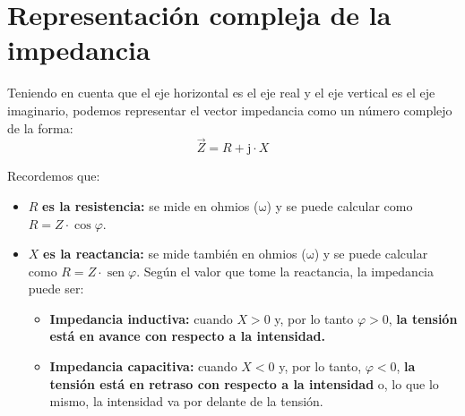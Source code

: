 \documentclass[
  a4paper,
  DIV=11,
  numbers=noendperiod]{scrreprt}
\providecommand{\tightlist}{%
  \setlength{\itemsep}{0pt}\setlength{\parskip}{0pt}}
\newcommand{\sen}{\operatorname{sen}}
\begin{document}
\section{Representación compleja de la
impedancia}\label{representaciuxf3n-compleja-de-la-impedancia}

Teniendo en cuenta que el eje horizontal es el eje real y el eje
vertical es el eje imaginario, podemos representar el vector impedancia
como un número complejo de la forma: \[ 
\vec{Z} = R + \mathrm{j} \cdot X 
\]

Recordemos que:

\begin{itemize}
\tightlist
\item
  \(R\) \textbf{es la resistencia:} se mide en ohmios
  (\(\mathrm{\omega}\)) y se puede calcular como
  \(R=Z \cdot \cos \varphi\).
\item
  \(X\) \textbf{es la reactancia:} se mide también en ohmios
  (\(\mathrm{\omega}\)) y se puede calcular como
  \(R=Z \cdot \sen \varphi\). Según el valor que tome la reactancia, la
  impedancia puede ser:

  \begin{itemize}
  \tightlist
  \item
    \textbf{Impedancia inductiva:} cuando \(X>0\) y, por lo tanto
    \(\varphi >0\), \textbf{la tensión está en avance con respecto a la
    intensidad.}
  \item
    \textbf{Impedancia capacitiva:} cuando \(X<0\) y, por lo tanto,
    \(\varphi <0\), \textbf{la tensión está en retraso con respecto a la
    intensidad} o, lo que lo mismo, la intensidad va por delante de la
    tensión.
  \end{itemize}
\end{itemize}
\end{document}
